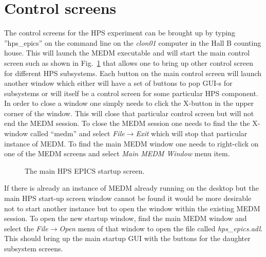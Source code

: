 \documentclass[letter,10pt]{article}
\begin{document}
\section{Control screens}
\label{sec:control_screens}
The control screens for the HPS experiment can be brought up by typing ''hps\_epics'' on the command line on the \textit{clon01} computer 
in the Hall B counting house. This will launch the MEDM executable and will start the  
main control screen such as shown in Fig.~\ref{fig:hps_epics_screen} that allows one to bring up other control screen for 
different HPS subsystems. 
Each button on the main control screen will launch another window which either will have a set of buttons to pop GUI-s for subsystems or will 
itself be a control screen for some particular HPS component. In order to close a window one simply needs to click the X-button in the upper 
corner of the window. This will close that particular control screen but will not end the MEDM session. To close the MEDM session one 
needs to find the the X-window called ``medm'' and select \textit{File}$\rightarrow$\textit{Exit} which will stop that particular instance of MEDM. 
To find the main MEDM window one needs to right-click on one of the MEDM screens and select \textit{Main MEDM Window} menu item. 
 \begin{figure}
  \centering
  \caption{The main HPS EPICS startup screen.} 
  \label{fig:hps_epics_screen}
 \end{figure}

If there is already an instance of MEDM already running on the desktop but the main HPS start-up screen window cannot be found it would be more 
desirable not to start another instance but to open the window within the existing MEDM session. To open the new startup window, find the main 
MEDM window and select the \textit{File}$\rightarrow$\textit{Open} menu of that window to open the file called \textit{hps\_epics.adl}. This should 
bring up the main startup GUI with the buttons for the daughter subsystem screens. 
\end{document}
